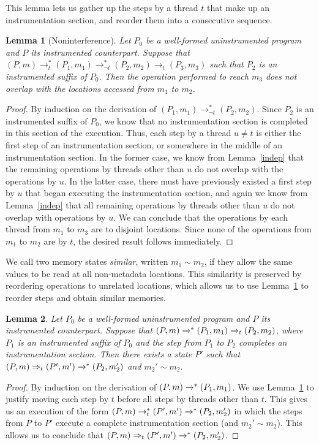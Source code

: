 \documentclass[preprint, 10pt]{sigplanconf}
\newcommand{\cfg}[2]{\ensuremath{(#1, #2)}}
\newcommand{\execstar}[4]{\ensuremath{\cfg{#1}{#2} \tto{#3} #4}}
\newcommand{\iexec}[4]{\ensuremath{\cfg{#1}{#2} \Rightarrow_{#3} #4}}
\newcommand{\execstart}[4]{\ensuremath{\cfg{#1}{#2} \rightarrow^{*}_{#3} #4}}
\newcommand{\execstarm}[4]{\ensuremath{\cfg{#1}{#2} \rightarrow^{*}_{\neg #3} #4}}
\newcommand{\execs}[3]{\ensuremath{ \xrightarrow{#2}_{#1} #3}}
\newcommand{\execstars}[2]{\ensuremath{ \tto{#1} #2}}
\newcommand{\execstarms}[2]{\ensuremath{ \rightarrow^{*}_{\neg #1} #2}}
\newcommand{\tto}[1]{\mathrel{
  \vphantom{\xrightarrow{#1}}
  \smash{\xrightarrow{#1}}
  \vphantom{\to}^{*}}
}
\newtheorem{lemma}{Lemma}
\begin{document}
This lemma lets us gather up the steps by a thread $t$ that make up an instrumentation section, and reorder them into a consecutive sequence.
\begin{lemma}[Noninterference]\label{noninterference}Let $P_0$ be a well-formed uninstrumented program and $P$ its instrumented counterpart. Suppose that $\execstart{P}{m}{t}{(P_1, m_1)} \execstarms{t}{(P_2, m_2)} \execs{t}{}{(P_3, m_3)}$ such that $P_2$ is an instrumented suffix of $P_0$. Then the operation performed to reach $m_3$ does not overlap with the locations accessed from $m_1$ to $m_2$.\end{lemma}
\begin{proof}By induction on the derivation of $\execstarm{P_1}{m_1}{t}{(P_2, m_2)}$. Since $P_2$ is an instrumented suffix of $P_0$, we know that no instrumentation section is completed in this section of the execution. Thus, each step by a thread $u \neq t$ is either the first step of an instrumentation section, or somewhere in the middle of an instrumentation section. In the former case, we know from Lemma~\ref{indep} that the remaining operations by threads other than $u$ do not overlap with the operations by $u$. In the latter case, there must have previously existed a first step by $u$ that began executing the instrumentation section, and again we know from Lemma~\ref{indep} that all remaining operations by threads other than $u$ do not overlap with operations by $u$. We can conclude that the operations by each thread from $m_1$ to $m_3$ are to disjoint locations. Since none of the operations from $m_1$ to $m_2$ are by $t$, the desired result follows immediately.\end{proof}

We call two memory states \emph{similar}, written $m_1 \sim m_2$, if they allow the same values to be read at all non-metadata locations. This similarity is preserved by reordering operations to unrelated locations, which allows us to use Lemma~\ref{noninterference} to reorder steps and obtain similar memories.
\begin{lemma}\label{first-finished}Let $P_0$ be a well-formed uninstrumented program and $P$ its instrumented counterpart. Suppose that $\execstar{P}{m}{}{(P_1, m_1)} \execs{t}{}{(P_2, m_2)}$, where $P_1$ is an instrumented suffix of $P_0$ and the step from $P_1$ to $P_2$ completes an instrumentation section. Then there exists a state $P'$ such that $\iexec{P}{m}{t}{(P', m')} \execstars{}{(P_2, m_2')}$ and $m_2' \sim m_2$.\end{lemma}
\begin{proof}By induction on the derivation of $\execstar{P}{m}{}{(P_1, m_1)}$. We use Lemma~\ref{noninterference} to justify moving each step by $t$ before all steps by threads other than $t$. This gives us an execution of the form $\execstart{P}{m}{t}{(P', m')} \execstars{}{(P_2, m_2')}$ in which the steps from $P$ to $P'$ execute a complete instrumentation section (and $m_2' \sim m_2$). This allows us to conclude that $\iexec{P}{m}{t}{(P', m')} \execstars{}{(P_2, m_2')}$.\end{proof}
\end{document}
